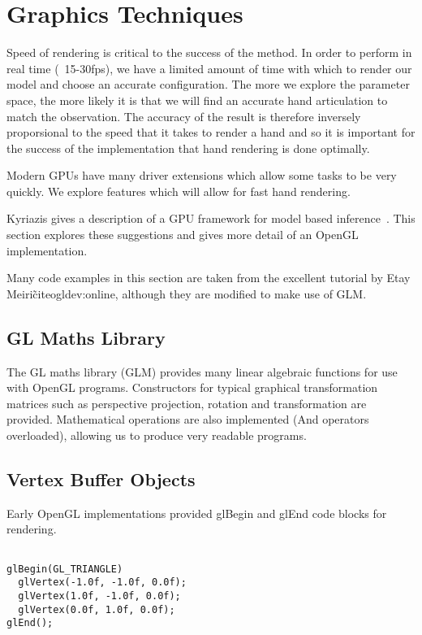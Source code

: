 \chapter{Graphics Techniques}
\label{chap:graphics}

Speed of rendering is critical to the success of the method.  In order to perform in real time (~15-30fps), we have a limited amount of time with which to render our model and choose an accurate configuration.  The more we explore the parameter space, the more likely it is that we will find an accurate hand articulation to match the observation.  The accuracy of the result is therefore inversely proporsional to the speed that it takes to render a hand and so it is important for the success of the implementation that hand rendering is done optimally.

Modern GPUs have many driver extensions which allow some tasks to be very quickly.  We explore features which will allow for fast hand rendering.

Kyriazis gives a description of a GPU framework for model based inference~\cite{kyriazis2011}.  This section explores these suggestions and gives more detail of an OpenGL implementation.

Many code examples in this section are taken from the excellent tutorial by Etay
Meiri\~cite{ogldev:online}, although they are modified to make use of GLM.

\section{GL Maths Library}

The GL maths library (GLM) provides many linear algebraic functions for use with
OpenGL programs.  Constructors for typical graphical transformation matrices such as perspective
projection, rotation and transformation are provided.  Mathematical operations
are also implemented (And operators overloaded), allowing us to produce very
readable programs.

\section{Vertex Buffer Objects}
\label{sec:vbo}

Early OpenGL implementations provided glBegin and glEnd code blocks for rendering.

\begin{verbatim}

glBegin(GL_TRIANGLE)
  glVertex(-1.0f, -1.0f, 0.0f);
  glVertex(1.0f, -1.0f, 0.0f);
  glVertex(0.0f, 1.0f, 0.0f);
glEnd();

\end{verbatim}

